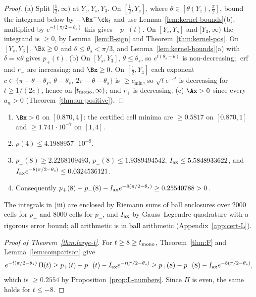 \begin{proof}
(a) Split $[\frac12,\infty)$ at $Y_z,Y_s,Y_3$. On $[\frac12,Y_z]$, where $\theta\in[\theta(Y_z),\frac\pi2]$, bound the integrand below by $-\Bx^-\ck_t$ and use
Lemma~\ref{lem:kernel-bounds}(b); multiplied by $e^{-t(\pi/2-\theta_s)}$ this gives $-p_-(t)$. On $[Y_z,Y_s]$ and $[Y_3,\infty)$ the integrand is $\ge0$,
by Lemma~\ref{lem:B-sign} and Theorem~\ref{thm:kernel-pos}. On $[Y_s,Y_3]$, $\Bx\ge0$ and $\theta\le\theta_s<\pi/3$, and Lemma~\ref{lem:kernel-bounds}(a)
with $\delta=\kappa\theta$ gives $p_+(t)$. (b) On $[Y_s,Y_3]$, $\theta\le\theta_s$, so $e^{t(\theta_s-\theta)}$ is non-decreasing; $\operatorname{erf}$ and
$r_-$ are increasing; and $\Bx\ge0$. On $[\frac12,Y_z]$ each exponent $c\in\{\pi-\theta-\theta_s,\ \theta-\theta_s,\ 2\pi-\theta-\theta_s\}$ is $\ge c_{\min}$, so
$\sqrt te^{-ct}$ is decreasing for $t\ge1/(2c)$, hence on $[t_{\rm mono},\infty)$; and $r_+$ is decreasing. (c) $\Ax>0$ since every $a_n>0$
(Theorem~\ref{thm:an-positive}).
\end{proof}

\begin{proposition}\label{prop:L-numbers}
\begin{enumerate}[label=\textup{(\roman*)}]
\item $\Bx>0$ on $[0.870,4]$: the certified cell minima are $\ge0.5817$ on $[0.870,1]$ and $\ge1.741\cdot10^{-7}$ on $[1,4]$.
\item $\bar\rho(4)\le4.1988957\cdot10^{-9}$.
\item $p_+(8)\ge2.2268109493$, $p_-(8)\le1.9389494542$, $I_{\rm ax}\le5.5848933622$, and $I_{\rm ax}e^{-8(\pi/2-\theta_s)}\le0.0324536121$.
\item Consequently $p_+(8)-p_-(8)-I_{\rm ax}e^{-8(\pi/2-\theta_s)}\ge0.25540788>0$.
\end{enumerate}
\end{proposition}

The integrals in (iii) are enclosed by Riemann sums of ball enclosures over $2000$ cells for $p_+$ and $8000$ cells for $p_-$, and $I_{\rm ax}$ by
Gauss--Legendre quadrature with a rigorous error bound; all arithmetic is in ball arithmetic (Appendix~\ref{app:cert-L}).

\begin{proof}[Proof of Theorem~\ref{thm:large-t}]
For $t\ge8\ge t_{\rm mono}$, Theorem~\ref{thm:F} and Lemma~\ref{lem:comparison} give
\[
e^{-t(\pi/2-\theta_s)}\,\Pi(t)\ge p_+(t)-p_-(t)-I_{\rm ax}e^{-t(\pi/2-\theta_s)}\ge p_+(8)-p_-(8)-I_{\rm ax}e^{-8(\pi/2-\theta_s)},
\]
which is $\ge0.2554$ by Proposition~\ref{prop:L-numbers}. Since $\Pi$ is even, the same holds for $t\le-8$.
\end{proof}

